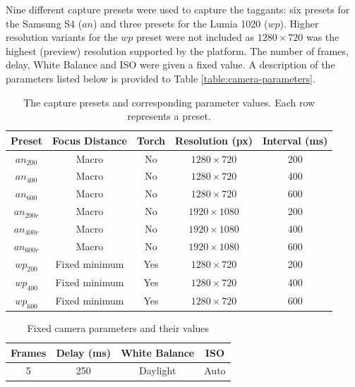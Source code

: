 \documentclass[thesis.tex]{subfiles}
\begin{document}
Nine different capture presets were used to capture the taggants: six presets for the Samsung S4 ($an$) and three presets for the Lumia 1020 ($wp$). Higher resolution variants for the $wp$ preset were not included as $1280\times720$ was the highest (preview) resolution supported by the platform. The number of frames, delay, White Balance and ISO were given a fixed value. A description of the parameters listed below is provided to Table \ref{table:camera-parameters}.

\begin{table}[ht]
  \caption{The capture presets and corresponding parameter values. Each row represents a preset.}
  \vspace{-6mm}
  \begin{center}
  \begin{tabular}{| c | c | c | c | c |}
    \hline
    \textbf{Preset} & \textbf{Focus Distance} & \textbf{Torch} & \textbf{Resolution (px)} & \textbf{Interval (ms)} \\ \hline
    $an_{200}$ & Macro & No & $1280\times720$ & 200 \\
    \hline
    $an_{400}$ & Macro & No & $1280\times720$ & 400 \\
    \hline
    $an_{600}$ & Macro & No & $1280\times720$ & 600 \\
    \hline
    $an_{200r}$ & Macro & No & $1920\times1080$ & 200 \\
    \hline
    $an_{400r}$ & Macro & No & $1920\times1080$ & 400 \\
    \hline
    $an_{600r}$ & Macro & No & $1920\times1080$ & 600 \\
    \hline
    $wp_{200}$ & Fixed minimum & Yes & $1280\times720$ & 200 \\
    \hline
    $wp_{400}$ & Fixed minimum & Yes & $1280\times720$ & 400 \\
    \hline
    $wp_{600}$ & Fixed minimum & Yes & $1280\times720$ & 600 \\
    \hline
  \end{tabular}
  \end{center}
\end{table}
\vspace{-4mm}
\begin{table}[ht]
  \caption{Fixed camera parameters and their values}
  \vspace{-2mm}
  \begin{center}
  \begin{tabular}{| c | c | c | c |}
    \hline
    \textbf{Frames}  & \textbf{Delay (ms)} & \textbf{White Balance} & \textbf{ISO} \\ \hline
    5 & 250 & Daylight & Auto \\
    \hline
  \end{tabular}
  \end{center}
\end{table}
\end{document}
